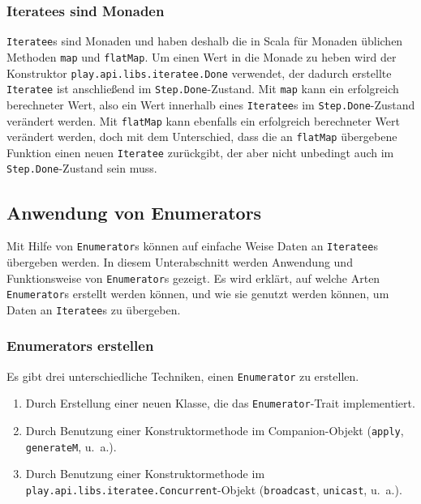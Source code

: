
\subsubsection{Iteratees sind Monaden} %
\label{ssub:iteratees_sind_monaden}

\lstinline|Iteratee|s sind Monaden und haben deshalb die in Scala für Monaden üblichen Methoden \lstinline|map| und \lstinline|flatMap|.
Um einen Wert in die Monade zu heben wird der Konstruktor \lstinline|play.api.libs.iteratee.Done| verwendet, der dadurch erstellte \lstinline|Iteratee| ist anschließend im \lstinline|Step.Done|-Zustand.
Mit \lstinline|map| kann ein erfolgreich berechneter Wert, also ein Wert innerhalb eines \lstinline|Iteratee|s im \lstinline|Step.Done|-Zustand verändert werden.
Mit \lstinline|flatMap| kann ebenfalls ein erfolgreich berechneter Wert verändert werden, doch mit dem Unterschied, dass die an \lstinline|flatMap| übergebene Funktion einen neuen \lstinline|Iteratee| zurückgibt, der aber nicht unbedingt auch im \lstinline|Step.Done|-Zustand sein muss.



\subsection{Anwendung von Enumerators} %
\label{sub:enumerators}

Mit Hilfe von \lstinline|Enumerator|s können auf einfache Weise Daten an \lstinline|Iteratee|s übergeben werden.
In diesem Unterabschnitt werden Anwendung und Funktionsweise von \lstinline|Enumerator|s gezeigt.
Es wird erklärt, auf welche Arten \lstinline|Enumerator|s erstellt werden können, und wie sie genutzt werden können, um Daten an \lstinline|Iteratee|s zu übergeben.

\subsubsection{Enumerators erstellen} %
\label{ssub:enumerators_erstellen}

Es gibt drei unterschiedliche Techniken, einen \lstinline|Enumerator| zu erstellen.
\begin{enumerate}
  \item Durch Erstellung einer neuen Klasse, die das \lstinline|Enumerator|-Trait implementiert.
  \item Durch Benutzung einer Konstruktormethode im Companion-Objekt (\lstinline|apply|, \lstinline|generateM|, u.~a.).
  \item Durch Benutzung einer Konstruktormethode im \lstinline|play.api.libs.iteratee.Concurrent|-Objekt (\lstinline|broadcast|, \lstinline|unicast|, u.~a.).
\end{enumerate}

